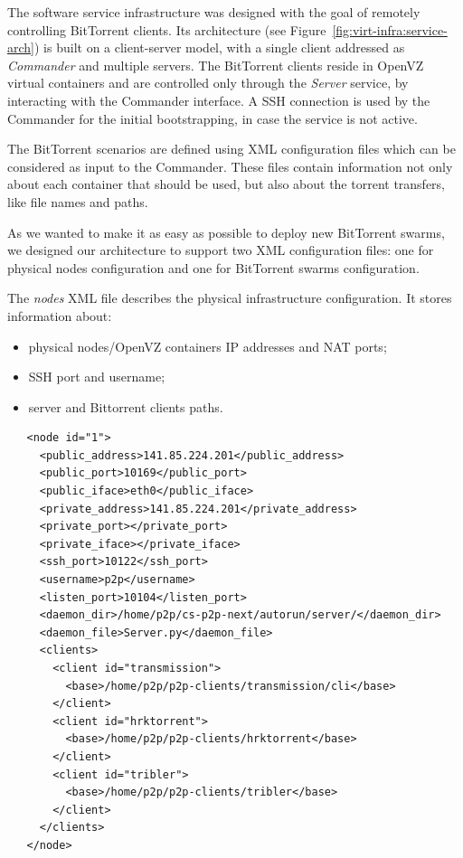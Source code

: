 The software service infrastructure was designed with the goal of remotely
controlling BitTorrent clients. Its architecture (see
Figure~\ref{fig:virt-infra:service-arch}) is built on a client-server model,
with a single client addressed as \textit{Commander} and multiple servers. The
BitTorrent clients reside in OpenVZ virtual containers and are controlled only
through the \textit{Server} service, by interacting with the Commander
interface. A SSH connection is used by the Commander for the initial
bootstrapping, in case the service is not active.

The BitTorrent scenarios are defined using XML configuration files which can
be considered as input to the Commander. These files contain information not
only about each container that should be used, but also about the torrent
transfers, like file names and paths.

As we wanted to make it as easy as possible to deploy new BitTorrent swarms,
we designed our architecture to support two XML configuration files: one for
physical nodes configuration and one for BitTorrent swarms configuration.

The \textit{nodes} XML file describes the physical infrastructure
configuration. It stores information about:

\begin{itemize}
 \item physical nodes/OpenVZ containers IP addresses and NAT ports;
 \item SSH port and username;
 \item server and Bittorrent clients paths.
\end{itemize}

\scriptsize
\begin{verbatim}
   <node id="1">
     <public_address>141.85.224.201</public_address>
     <public_port>10169</public_port>
     <public_iface>eth0</public_iface>
     <private_address>141.85.224.201</private_address>
     <private_port></private_port>
     <private_iface></private_iface>
     <ssh_port>10122</ssh_port>
     <username>p2p</username>
     <listen_port>10104</listen_port>
     <daemon_dir>/home/p2p/cs-p2p-next/autorun/server/</daemon_dir>
     <daemon_file>Server.py</daemon_file>
     <clients>
       <client id="transmission">
         <base>/home/p2p/p2p-clients/transmission/cli</base>
       </client>
       <client id="hrktorrent">
         <base>/home/p2p/p2p-clients/hrktorrent</base>
       </client>
       <client id="tribler">
         <base>/home/p2p/p2p-clients/tribler</base>
       </client>
     </clients>
   </node>
\end{verbatim}
\normalsize


